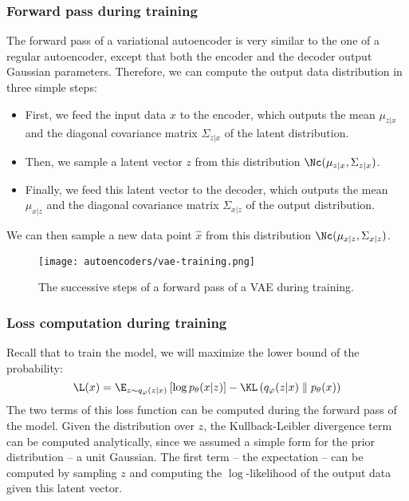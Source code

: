 \subsubsection{Forward pass during training}
The forward pass of a variational autoencoder is very similar to the one of a regular autoencoder, except that both the encoder and the decoder output Gaussian parameters. Therefore, we can compute the output data distribution in three simple steps:
\begin{itemize}
    \item First, we feed the input data $x$ to the encoder, which outputs the mean $\mu_{z|x}$ and the diagonal covariance matrix $\Sigma_{z|x}$ of the latent distribution.
    \item Then, we sample a latent vector $z$ from this distribution $\Nc(\mu_{z|x}, \Sigma_{z|x})$.
    \item Finally, we feed this latent vector to the decoder, which outputs the mean $\mu_{x|z}$ and the diagonal covariance matrix $\Sigma_{x|z}$ of the output distribution.
\end{itemize}
We can then sample a new data point $\hat{x}$ from this distribution $\Nc(\mu_{x|z}, \Sigma_{x|z})$.
\begin{figure}[H]
    \centering
    \texttt{[image: autoencoders/vae-training.png]}
    \caption{The successive steps of a forward pass of a VAE during training.}
\end{figure}


\subsubsection{Loss computation during training}
Recall that to train the model, we will maximize the lower bound of the probability:
\begin{equation*}
    \L(x) = \E_{z\sim q_\varphi(z|x)}\left[\log p_\theta(x|z)\right] - \KL\left(q_\varphi(z|x)\parallel p_\theta(x)\right)
\end{equation*}
The two terms of this loss function can be computed during the forward pass of the model. Given the distribution over $z$, the Kullback-Leibler divergence term can be computed analytically, since we assumed a simple form for the prior distribution -- a unit Gaussian. The first term -- the expectation -- can be computed by sampling $z$ and computing the $\log$-likelihood of the output data given this latent vector.

